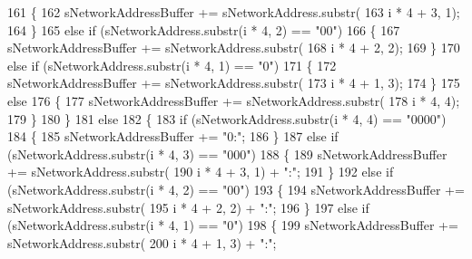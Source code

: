 \begin{DoxyCode}
161                         \{
162                             sNetworkAddressBuffer += sNetworkAddress.substr(
163                                     i * 4 + 3, 1);
164                         \}
165                         \textcolor{keywordflow}{else} \textcolor{keywordflow}{if} (sNetworkAddress.substr(i * 4, 2) == \textcolor{stringliteral}{"00"})
166                         \{
167                             sNetworkAddressBuffer += sNetworkAddress.substr(
168                                     i * 4 + 2, 2);
169                         \}
170                         \textcolor{keywordflow}{else} \textcolor{keywordflow}{if} (sNetworkAddress.substr(i * 4, 1) == \textcolor{stringliteral}{"0"})
171                         \{
172                             sNetworkAddressBuffer += sNetworkAddress.substr(
173                                     i * 4 + 1, 3);
174                         \}
175                         \textcolor{keywordflow}{else}
176                         \{
177                             sNetworkAddressBuffer += sNetworkAddress.substr(
178                                     i * 4, 4);
179                         \}
180                     \}
181                     \textcolor{keywordflow}{else}
182                     \{
183                         \textcolor{keywordflow}{if} (sNetworkAddress.substr(i * 4, 4) == \textcolor{stringliteral}{"0000"})
184                         \{
185                             sNetworkAddressBuffer += \textcolor{stringliteral}{"0:"};
186                         \}
187                         \textcolor{keywordflow}{else} \textcolor{keywordflow}{if} (sNetworkAddress.substr(i * 4, 3) == \textcolor{stringliteral}{"000"})
188                         \{
189                             sNetworkAddressBuffer += sNetworkAddress.substr(
190                                     i * 4 + 3, 1) + \textcolor{stringliteral}{":"};
191                         \}
192                         \textcolor{keywordflow}{else} \textcolor{keywordflow}{if} (sNetworkAddress.substr(i * 4, 2) == \textcolor{stringliteral}{"00"})
193                         \{
194                             sNetworkAddressBuffer += sNetworkAddress.substr(
195                                     i * 4 + 2, 2) + \textcolor{stringliteral}{":"};
196                         \}
197                         \textcolor{keywordflow}{else} \textcolor{keywordflow}{if} (sNetworkAddress.substr(i * 4, 1) == \textcolor{stringliteral}{"0"})
198                         \{
199                             sNetworkAddressBuffer += sNetworkAddress.substr(
200                                     i * 4 + 1, 3) + \textcolor{stringliteral}{":"};

\end{DoxyCode}
